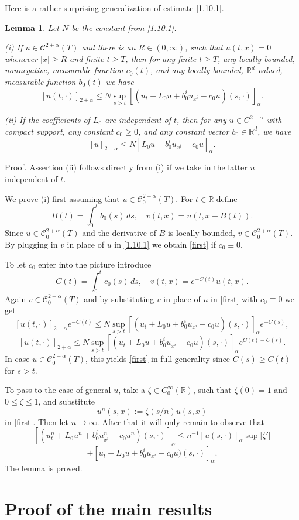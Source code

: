 \documentclass[reqno,12pt]{amsart}
\newtheorem{lemma}[theorem]{Lemma}
\theoremstyle{definition}
\theoremstyle{remark}
\begin{document}
   Here is a rather surprising generalization of estimate
\eqref{1.10.1}.

\begin{lemma}
                                            \label{lemma 1.10.1}
Let $N$ be the constant from \eqref{1.10.1}.

(i) If $u\in{\mathcal{C}}^{2+\alpha}(T)$ and there is an $R\in(0,\infty)$,
such that $u(t,x)=0$ whenever $|x|\geq R$ and finite $t\ge  T$, then
for any finite $t\ge  T$, any locally bounded, nonnegative,  measurable
function $c_{0}(t)$, and any locally bounded, ${\mathbb{R}}^{d}$-valued,
measurable function $b_{0}(t)$ we have
\begin{equation}
                                                 \label{first}
[u(t,\cdot)]_{ 2+\alpha} \leq N \sup_{s> t}[(u_{t}+
L_{0}u+b^{i}_{0}u_{x^{i}}-c_{0}u) (s,\cdot)]_{\alpha}.
\end{equation}

   (ii) If the coefficients of $L_{0}$ are independent of $t$,
then for any $u\in C^{2+\alpha} $ with compact support,
any constant $c_{0}\geq0$, and any constant vector
$b_0\in{\mathbb{R}}^{d}$, we have
$$
[u]_{ 2+\alpha}\leq N [L_{0}u+b^{i}_{0}u_{x^{i}}-c_{0}u]_{\alpha}.
$$
\end{lemma}
Proof.  Assertion (ii) follows directly from (i) if we take in the
latter $u$ independent of $t$.

We prove (i) first assuming that $u\in{\mathcal{C}}^{2+\alpha}_{0}(T)$. For
$t\in{\mathbb{R}}$ define
$$
B(t)=\int_{0}^{t}b_{0}(s)\,ds,\quad v(t,x)=u(t,x+B(t)).
$$
Since $u\in{\mathcal{C}}^{2+\alpha}_{0}(T)$ and the derivative of $B$ is
locally bounded, $v\in{\mathcal{C}}^{2+\alpha}_{0}(T)$. By plugging in $v$
in place of $u$ in \eqref{1.10.1} we obtain \eqref{first} if
$c_{0}\equiv0$.

To let $c_{0}$ enter into the picture introduce
$$
C(t)=\int_{0}^{t}c_{0}(s)\,ds,\quad v(t,x)=e^{-C(t)}u(t,x).
$$
Again $v\in{\mathcal{C}}^{2+\alpha}_{0}(T)$ and by substituting $v$ in place
of $u$ in \eqref{first} with $c_{0}\equiv0$ we get
$$
[u(t,\cdot)]_{ 2+\alpha}e^{-C(t)} \leq N \sup_{s> t}[(u_{t}+
L_{0}u+b^{i}_{0}u_{x^{i}}-c_{0}u) (s,\cdot)]_{\alpha}e^{-C(s)},
$$
$$
[u(t,\cdot)]_{ 2+\alpha} \leq N \sup_{s> t}[(u_{t}+
L_{0}u+b^{i}_{0}u_{x^{i}}-c_{0}u)
(s,\cdot)]_{\alpha}e^{C(t)-C(s)}.
$$
In case $u\in{\mathcal{C}}^{2+\alpha}_{0}(T)$, this yields \eqref{first} in
full generality since $C(s)\geq C(t)$ for $s>t$.

    To pass to the case of general  $u$, take
a $\zeta\in C^{\infty}_{0}({\mathbb{R}})$, such that $\zeta(0)=1$ and
$0\leq\zeta\leq1$, and substitute
$$
u^{n}(s,x):=\zeta(s/n)u(s,x)
$$
in \eqref{first}. Then let $n\to\infty$. After that it will only
remain to observe that
$$
[(u^{n}_{t}+ L_{0}u^{n}+b^{i}_{0}u^{n}_{x^{i}}-c_{0}u^{n})
(s,\cdot)]_{\alpha}\leq n^{-1}  [u(s,\cdot)]_{\alpha}\sup|\zeta'|
$$
$$
+[u_t + L_{0}u+b^{i}_{0}u_{x^{i}}-c_{0}u) (s,\cdot) ]_{\alpha}.
$$
The lemma is proved. {\section{{Proof of the main results}}
\setcounter{equation}{0}}
\end{document}

